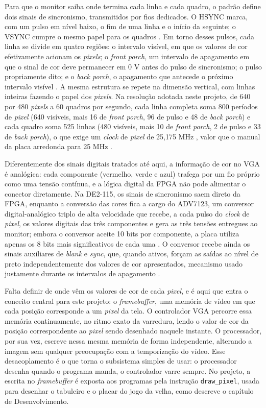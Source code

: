 \documentclass[
	12pt,
	oneside,
	a4paper,
	english,
	french,
	spanish,
	brazil,
	]{abntex2}
\begin{document}
Para que o monitor saiba onde termina cada linha e cada quadro, o padrão define dois sinais de sincronismo, transmitidos por fios dedicados. O HSYNC marca, com um pulso em nível baixo, o fim de uma linha e o início da seguinte; o VSYNC cumpre o mesmo papel para os quadros \cite{ManualFPGA}. Em torno desses pulsos, cada linha se divide em quatro regiões: o intervalo visível, em que os valores de cor efetivamente acionam os \emph{pixels}; o \emph{front porch}, um intervalo de apagamento em que o sinal de cor deve permanecer em 0 V antes do pulso de sincronismo; o pulso propriamente dito; e o \emph{back porch}, o apagamento que antecede o próximo intervalo visível \cite{ManualFPGA}. A mesma estrutura se repete na dimensão vertical, com linhas inteiras fazendo o papel dos \emph{pixels}. Na resolução adotada neste projeto, de 640 por 480 \emph{pixels} a 60 quadros por segundo, cada linha completa soma 800 períodos de \emph{pixel} (640 visíveis, mais 16 de \emph{front porch}, 96 de pulso e 48 de \emph{back porch}) e cada quadro soma 525 linhas (480 visíveis, mais 10 de \emph{front porch}, 2 de pulso e 33 de \emph{back porch}), o que exige um \emph{clock} de \emph{pixel} de 25,175 MHz \cite{ickes_vga}, valor que o manual da placa arredonda para 25 MHz \cite{ManualFPGA}.

Diferentemente dos sinais digitais tratados até aqui, a informação de cor no VGA é analógica: cada componente (vermelho, verde e azul) trafega por um fio próprio como uma tensão contínua, e a lógica digital da FPGA não pode alimentar o conector diretamente. Na DE2-115, os sinais de sincronismo saem direto da FPGA, enquanto a conversão das cores fica a cargo do ADV7123, um conversor digital-analógico triplo de alta velocidade que recebe, a cada pulso do \emph{clock} de \emph{pixel}, os valores digitais das três componentes e gera as três tensões entregues ao monitor; embora o conversor aceite 10 bits por componente, a placa utiliza apenas os 8 bits mais significativos de cada uma \cite{ManualFPGA}. O conversor recebe ainda os sinais auxiliares de \emph{blank} e \emph{sync}, que, quando ativos, forçam as saídas ao nível de preto independentemente dos valores de cor apresentados, mecanismo usado justamente durante os intervalos de apagamento \cite{ickes_vga}.

Falta definir de onde vêm os valores de cor de cada \emph{pixel}, e é aqui que entra o conceito central para este projeto: o \emph{framebuffer}, uma memória de vídeo em que cada posição corresponde a um \emph{pixel} da tela. O controlador VGA percorre essa memória continuamente, no ritmo exato da varredura, lendo o valor de cor da posição correspondente ao \emph{pixel} sendo desenhado naquele instante. O processador, por sua vez, escreve nessa mesma memória de forma independente, alterando a imagem sem qualquer preocupação com a temporização do vídeo. Esse desacoplamento é o que torna o subsistema simples de usar: o processador desenha quando o programa manda, o controlador varre sempre. No projeto, a escrita no \emph{framebuffer} é exposta aos programas pela instrução \texttt{draw\_pixel}, usada para desenhar o tabuleiro e o placar do jogo da velha, como descreve o capítulo de Desenvolvimento.
\end{document}
